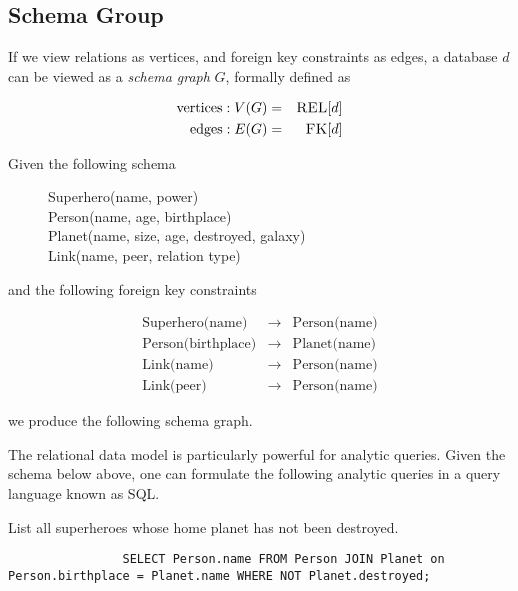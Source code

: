 	\subsection{Schema Group}
		\begin{defn}
			If we view relations as vertices, and foreign key constraints as edges, a database $d$ can be viewed as a \emph{schema graph} $G$, formally defined as
			
			\begin{eqnarray*}
				\mathrm{vertices}:  V(G) &=& \textsc{REL}\lbrack d\rbrack \\
				\mathrm{edges}:  E(G) &=& \textsc{FK}\lbrack d\rbrack
			\end{eqnarray*}
		\end{defn}
		
		\begin{ex}
			Given the following schema
			
			\begin{figure}[!ht]
				\centering
				
				Superhero(name, power) \\
				Person(name, age, birthplace) \\
				Planet(name, size, age, destroyed, galaxy) \\
				Link(name, peer, relation type) \\
			\end{figure}
			
			and the following foreign key constraints
			
			\begin{eqnarray*}
				\textrm{Superhero(name)} &\rightarrow& \textrm{Person(name)} \\
				\textrm{Person(birthplace)} &\rightarrow& \textrm{Planet(name)} \\
				\textrm{Link(name)} &\rightarrow& \textrm{Person(name)} \\
				\textrm{Link(peer)} &\rightarrow& \textrm{Person(name)}
			\end{eqnarray*}
			
			we produce the following schema graph.
			
		\end{ex}
		
		The relational data model is particularly powerful for analytic queries.  Given the schema below above, one can formulate the following analytic queries in a query language known as SQL.
			
		\begin{ex}
			List all superheroes whose home planet has not been destroyed.
			
			\begin{verbatim}
				SELECT Person.name FROM Person JOIN Planet on Person.birthplace = Planet.name WHERE NOT Planet.destroyed;
			\end{verbatim}
		\end{ex}
		
